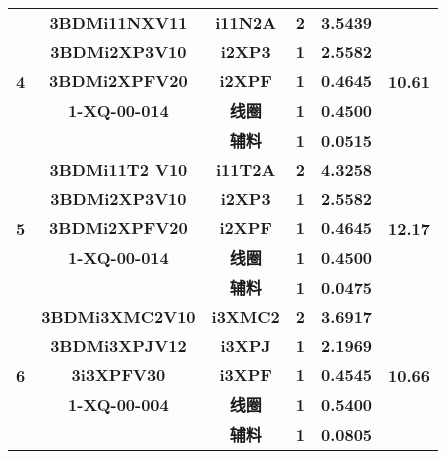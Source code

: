 \documentclass{ctexart}
\begin{document}
\begin{table}[htbp]
\begin{tabular}{ccccrc}
    \midrule
    \midrule
    \multirow{5}[10]{*}{\textbf{4}} & \textbf{3BDMi11NXV11} & \textbf{i11N2A} & \textbf{2} & \textbf{3.5439 } & \multirow{5}[10]{*}{\textbf{10.61 }} \\
\cmidrule{2-5}          & \textbf{3BDMi2XP3V10} & \textbf{i2XP3} & \textbf{1} & \textbf{2.5582 } &  \\
\cmidrule{2-5}          & \textbf{3BDMi2XPFV20} & \textbf{i2XPF} & \textbf{1} & \textbf{0.4645 } &  \\
\cmidrule{2-5}          & \textbf{1-XQ-00-014} & \textbf{线圈} & \textbf{1} & \textbf{0.4500 } &  \\
\cmidrule{2-5}          &       & \textbf{辅料} & \textbf{1} & \textbf{0.0515 } &  \\
    \midrule
    \midrule
    \multirow{5}[10]{*}{\textbf{5}} & \textbf{3BDMi11T2 V10} & \textbf{i11T2A} & \textbf{2} & \textbf{4.3258 } & \multirow{5}[10]{*}{\textbf{12.17 }} \\
\cmidrule{2-5}          & \textbf{3BDMi2XP3V10} & \textbf{i2XP3} & \textbf{1} & \textbf{2.5582 } &  \\
\cmidrule{2-5}          & \textbf{3BDMi2XPFV20} & \textbf{i2XPF} & \textbf{1} & \textbf{0.4645 } &  \\
\cmidrule{2-5}          & \textbf{1-XQ-00-014} & \textbf{线圈} & \textbf{1} & \textbf{0.4500 } &  \\
\cmidrule{2-5}          &       & \textbf{辅料} & \textbf{1} & \textbf{0.0475 } &  \\
    \midrule
    \midrule
    \multirow{5}[10]{*}{\textbf{6}} & \textbf{3BDMi3XMC2V10} & \textbf{i3XMC2} & \textbf{2} & \textbf{3.6917 } & \multirow{5}[10]{*}{\textbf{10.66 }} \\
\cmidrule{2-5}          & \textbf{3BDMi3XPJV12} & \textbf{i3XPJ} & \textbf{1} & \textbf{2.1969 } &  \\
\cmidrule{2-5}          & \textbf{3i3XPFV30} & \textbf{i3XPF} & \textbf{1} & \textbf{0.4545 } &  \\
\cmidrule{2-5}          & \textbf{1-XQ-00-004} & \textbf{线圈} & \textbf{1} & \textbf{0.5400 } &  \\
\cmidrule{2-5}          &       & \textbf{辅料} & \textbf{1} & \textbf{0.0805 } &  \\
    \bottomrule
    \bottomrule
    \end{tabular}%
  \label{tab:addlabel}%
\end{table}%
\end{document}
